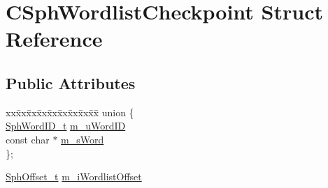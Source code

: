 \hypertarget{structCSphWordlistCheckpoint}{\section{C\-Sph\-Wordlist\-Checkpoint Struct Reference}
\label{structCSphWordlistCheckpoint}
}
\subsection*{Public Attributes}
\begin{DoxyCompactItemize}
\item 
\begin{tabbing}
xx\=xx\=xx\=xx\=xx\=xx\=xx\=xx\=xx\=\kill
union \{\\
\>\hyperlink{sphinx_8h_a80a94d5984fdf9214a98f3e5e65df963}{SphWordID\_t} \hyperlink{structCSphWordlistCheckpoint_ad97e6886426e191550c355b057eacfc5}{m\_uWordID}\\
\>const char $\ast$ \hyperlink{structCSphWordlistCheckpoint_a4f0bc15cd873c947f5cde1ecef94f606}{m\_sWord}\\
\}; \\

\end{tabbing}\item 
\hyperlink{sphinx_8h_a0fb3b64afebef33c61367714754eaa90}{Sph\-Offset\-\_\-t} \hyperlink{structCSphWordlistCheckpoint_a8fdb1966528fc8cd3e59ed00a0b7ef56}{m\-\_\-i\-Wordlist\-Offset}
\end{DoxyCompactItemize}


